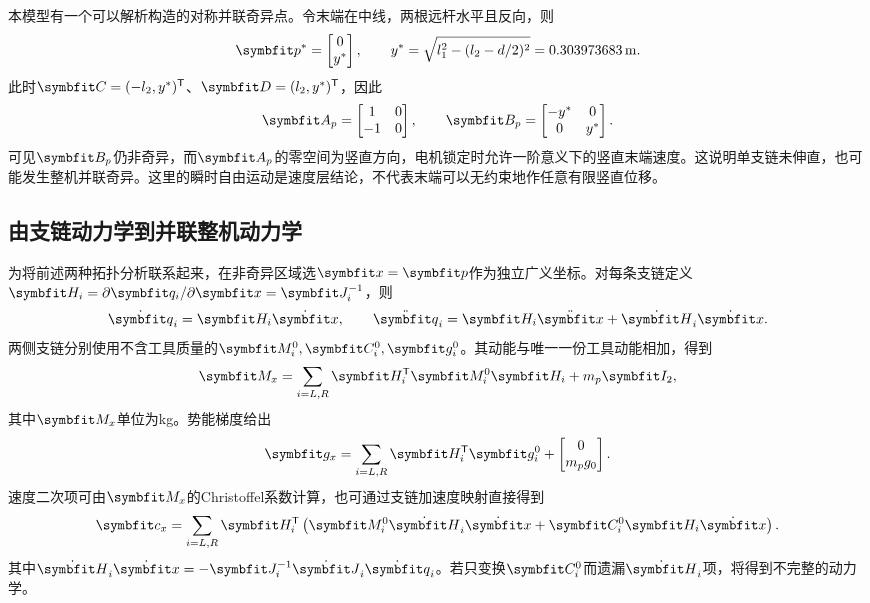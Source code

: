 本模型有一个可以解析构造的对称并联奇异点。令末端在中线，两根远杆水平且反向，则
\begin{equation}
\vect p^*=\begin{bmatrix}0\\y^*\end{bmatrix},\qquad
y^*=\sqrt{l_1^2-(l_2-d/2)^2}=0.303973683\units m.
\label{eq:singular_point}
\end{equation}
此时$\vect C=(-l_2,y^*)^\T$、$\vect D=(l_2,y^*)^\T$，因此
\begin{equation}
\vect A_p=\begin{bmatrix}1&0\\-1&0\end{bmatrix},\qquad
\vect B_p=\begin{bmatrix}-y^*&0\\0&y^*\end{bmatrix}.
\end{equation}
可见$\vect B_p$仍非奇异，而$\vect A_p$的零空间为竖直方向，电机锁定时允许一阶意义下的竖直末端速度。这说明单支链未伸直，也可能发生整机并联奇异。这里的瞬时自由运动是速度层结论，不代表末端可以无约束地作任意有限竖直位移。

\subsection{由支链动力学到并联整机动力学}
\label{sec:parallel_dyn}

为将前述两种拓扑分析联系起来，在非奇异区域选$\vect x=\vect p$作为独立广义坐标。对每条支链定义$\vect H_i=\partial\vect q_i/\partial\vect x=\vect J_i^{-1}$，则
\begin{equation}
\dot{\vect q}_i=\vect H_i\dot{\vect x},\qquad
\ddot{\vect q}_i=\vect H_i\ddot{\vect x}+\dot{\vect H}_i\dot{\vect x}.
\end{equation}
两侧支链分别使用不含工具质量的$\vect M_i^0,\vect C_i^0,\vect g_i^0$。其动能与唯一一份工具动能相加，得到
\begin{equation}
\vect M_x=\sum_{i=L,R}\vect H_i^\T\vect M_i^0\vect H_i+m_p\vect I_2,
\label{eq:mx}
\end{equation}
其中$\vect M_x$单位为kg。势能梯度给出
\begin{equation}
\vect g_x=\sum_{i=L,R}\vect H_i^\T\vect g_i^0+\begin{bmatrix}0\\m_pg_0\end{bmatrix}.
\end{equation}
速度二次项可由$\vect M_x$的Christoffel系数计算，也可通过支链加速度映射直接得到
\begin{equation}
\vect c_x=\sum_{i=L,R}\vect H_i^\T
\left(\vect M_i^0\dot{\vect H}_i\dot{\vect x}+\vect C_i^0\vect H_i\dot{\vect x}\right).
\label{eq:cx}
\end{equation}
其中$\dot{\vect H}_i\dot{\vect x}=-\vect J_i^{-1}\dot{\vect J}_i\dot{\vect q}_i$。若只变换$\vect C_i^0$而遗漏$\dot{\vect H}_i$项，将得到不完整的动力学。

